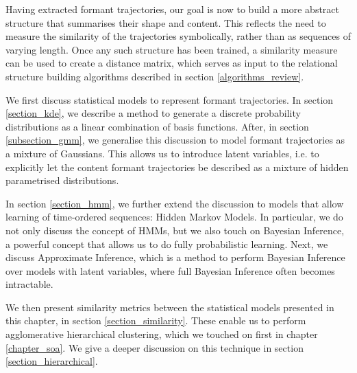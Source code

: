 \documentclass[../main.tex]{subfiles}
\begin{document}
 \label{chapter_hmms}

Having extracted formant trajectories, our goal is now to build a more abstract structure that summarises their shape and content. This reflects the need to measure the similarity of the trajectories symbolically, rather than as sequences of varying length. Once any such structure has been trained, a similarity measure can be used to create a distance matrix, which serves as input to the relational structure building algorithms described in section \ref{algorithms_review}.
\par We first discuss statistical models to represent formant trajectories. In section \ref{section_kde}, we describe a method to generate a discrete probability distributions as a linear combination of basis functions. After, in section \ref{subsection_gmm}, we generalise this discussion to model formant trajectories as a mixture of Gaussians. This allows us to introduce latent variables, i.e. to explicitly let the content formant trajectories be described
as a mixture of hidden parametrised distributions.
\par In section \ref{section_hmm}, we further extend the discussion to models that allow learning of time-ordered sequences: Hidden Markov Models. In particular, we do not only discuss the concept of HMMs, but we also touch on Bayesian Inference, a powerful concept that allows us to do fully probabilistic learning. Next, we discuss Approximate
Inference, which is a method to perform Bayesian Inference over models with latent variables, where full Bayesian Inference often becomes intractable.
\par We then present similarity metrics between the statistical models presented in this chapter, in section \ref{section_similarity}. These enable us to perform agglomerative hierarchical clustering, which we touched on first in chapter \ref{chapter_soa}. We give a deeper discussion on this technique in section \ref{section_hierarchical}.
\end{document}
